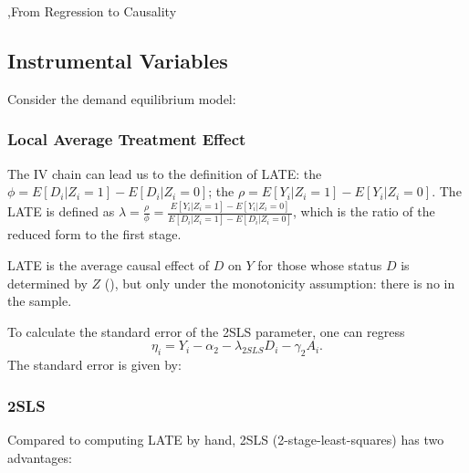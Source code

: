 \documentclass[10pt]{report}
\begin{document}
\sep{From Regression to Causality}

\subsection{Instrumental Variables}

Consider the demand equilibrium model:

\subsubsection{Local Average Treatment Effect}
The IV chain can lead us to the definition of LATE: the  $\phi=E[D_i|Z_i=1]-E[D_i|Z_i=0]$; the  $\rho=E[Y_i|Z_i=1]-E[Y_i|Z_i=0]$. 
The LATE is defined as $\lambda=\frac{\rho}{\phi}=\frac{E[Y_i|Z_i=1]-E[Y_i|Z_i=0]}{E[D_i|Z_i=1]-E[D_i|Z_i=0]}$, which is the ratio of the reduced form to the first stage. 
\begin{center}
    LATE is the average causal effect of $D$ on $Y$ for those whose status $D$ is determined  by $Z$ (), but only under the monotonicity assumption: there is no  in the sample.
\end{center}
To calculate the standard error of the 2SLS parameter, one can regress 
\[
    \eta_i=Y_i-\alpha_2-\lambda_{2SLS}D_i-\gamma_2A_i.    
\]
The standard error is given by:

\subsubsection{2SLS}
Compared to computing LATE by hand, 2SLS (2-stage-least-squares) has two advantages:
\end{document}
